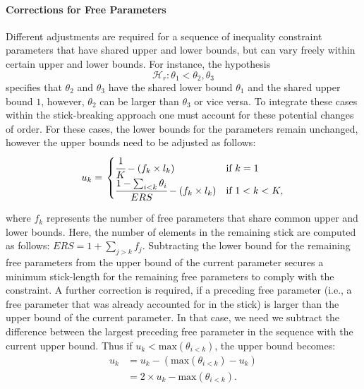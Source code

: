 \documentclass[
  english,
  man,floatsintext]{apa6}
\let\oldparagraph\paragraph
\renewcommand{\paragraph}[1]{\oldparagraph{#1}\mbox{}}
\begin{document}
\hypertarget{corrections-for-free-parameters}{%
\paragraph{Corrections for Free Parameters}\label{corrections-for-free-parameters}}

Different adjustments are required for a sequence of inequality constraint parameters that have shared upper and lower bounds, but can vary freely within certain upper and lower bounds. For instance, the hypothesis \[\mathcal{H}_r: \theta_1 < \theta_2, \theta_3\] specifies that \(\theta_2\) and \(\theta_3\) have the shared lower bound \(\theta_1\) and the shared upper bound \(1\), however, \(\theta_2\) can be larger than \(\theta_3\) or vice versa. To integrate these cases within the stick-breaking approach one must account for these potential changes of order. For these cases, the lower bounds for the parameters remain unchanged, however the upper bounds need to be adjusted as follows:
\begin{align}
  u_k = \left.
  \begin{cases}
      \cfrac{1}{K} - (f_k \times l_k) & \text{if } k = 1 \\
      \cfrac{1 - \sum_{i < k} \theta_i}{ERS} - (f_k \times l_k) & \text{if } 1 < k < K,
  \end{cases}
    \right.
\end{align}

where \(f_k\) represents the number of free parameters that share common upper and lower bounds. Here, the number of elements in the remaining stick are computed as follows: \(ERS = 1 + \sum_{j > k} f_j\). Subtracting the lower bound for the remaining free parameters from the upper bound of the current parameter secures a minimum stick-length for the remaining free parameters to comply with the constraint. A further correction is required, if a preceding free parameter (i.e., a free parameter that was already accounted for in the stick) is larger than the upper bound of the current parameter. In that case, we need we subtract the difference between the largest preceding free parameter in the sequence with the current upper bound. Thus if \(u_k < \text{max}(\theta_{i < k})\), the upper bound becomes:
\begin{align}
u_k &= u_k - (\text{max}(\theta_{i < k}) - u_k)\\
    &= 2 \times u_k - \text{max}(\theta_{i < k}).
\end{align}
\end{document}

